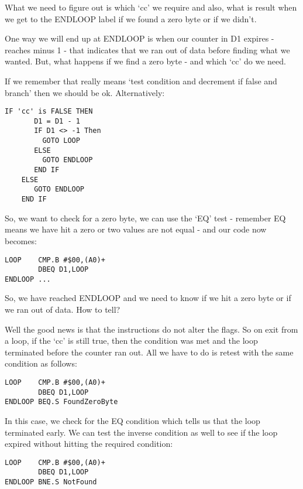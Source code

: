 What we need to figure out is which `cc' we require and also, what is result
        when we get to the ENDLOOP label if we found a zero byte or if we didn't.

One way we will end up at ENDLOOP is when our counter in D1 expires -{}
        reaches minus 1 -{} that indicates that we ran out of data before finding what we
        wanted. But, what happens if we find a zero byte -{} and which `cc' do we
        need.

If we remember that  really means `test condition and decrement if false
        and branch' then we should be ok. Alternatively:

\begin{lstlisting}[firstnumber=1,]
    IF 'cc' is FALSE THEN
       D1 = D1 - 1
       IF D1 <> -1 Then
         GOTO LOOP
       ELSE
         GOTO ENDLOOP
       END IF
    ELSE
       GOTO ENDLOOP
    END IF
\end{lstlisting}

So, we want to check for a zero byte, we can use the `EQ' test -{} remember EQ
        means we have hit a zero or two values are not equal -{} and our code now
        becomes:

\begin{lstlisting}[firstnumber=1,]
LOOP    CMP.B #$00,(A0)+
        DBEQ D1,LOOP
ENDLOOP ...
\end{lstlisting}

So, we have reached ENDLOOP and we need to know if we hit a zero byte or if
        we ran out of data. How to tell?

Well the good news is that the  instructions do not alter the flags. So
        on exit from a  loop, if the `cc' is still true, then the condition was met
        and the loop terminated before the counter ran out. All we have to do is retest
        with the same condition as follows:

\begin{lstlisting}[firstnumber=1,]
LOOP    CMP.B #$00,(A0)+
        DBEQ D1,LOOP
ENDLOOP BEQ.S FoundZeroByte
\end{lstlisting}

In this case, we check for the EQ condition which tells us that the loop
        terminated early. We can test the inverse condition as well to see if the loop
        expired without hitting the required condition:

\begin{lstlisting}[firstnumber=1,]
LOOP    CMP.B #$00,(A0)+
        DBEQ D1,LOOP
ENDLOOP BNE.S NotFound
\end{lstlisting}

